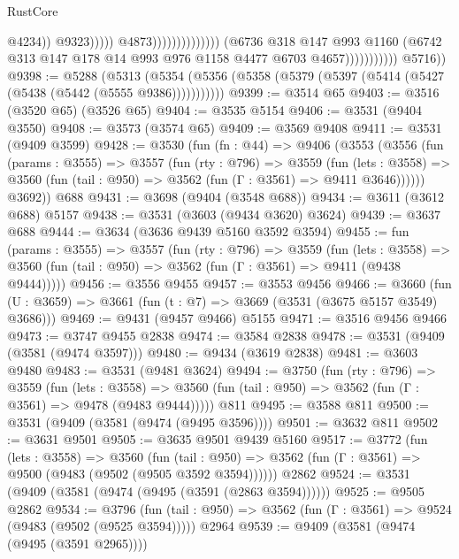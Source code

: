 \begin{lexlean}{RustCore}
\begin{coremodule}
                                                                    @4234))
                                                                @9323)))))
                                                      @4873))))))))))))))
                          (@6736
                            @318
                            @147
                            @993
                            @1160
                            (@6742 @313 @147 @178 @14 @993 @976 @1158 @4477 @6703 @4657)))))))))))
        @5716))
@9398 := @5288
    (@5313 (@5354 (@5356 (@5358 (@5379 (@5397 (@5414 (@5427 (@5438 (@5442 (@5555 @9386)))))))))))
@9399 := @3514 @65
@9403 := @3516 (@3520 @65) (@3526 @65)
@9404 := @3535 @5154
@9406 := @3531 (@9404 @3550)
@9408 := @3573 (@3574 @65)
@9409 := @3569 @9408
@9411 := @3531 (@9409 @3599)
@9428 := @3530
    (fun (fn : @44) =>
    @9406
      (@3553
        (@3556
          (fun (params : @3555) =>
          @3557
            (fun (rty : @796) =>
            @3559
              (fun (lets : @3558) =>
              @3560 (fun (tail : @950) => @3562 (fun (Γ : @3561) => @9411 @3646))))))
        @3692))
    @688
@9431 := @3698 (@9404 (@3548 @688))
@9434 := @3611 (@3612 @688) @5157
@9438 := @3531 (@3603 (@9434 @3620) @3624)
@9439 := @3637 @688
@9444 := @3634 (@3636 @9439 @5160 @3592 @3594)
@9455 := fun (params : @3555) =>
  @3557
    (fun (rty : @796) =>
    @3559
      (fun (lets : @3558) =>
      @3560 (fun (tail : @950) => @3562 (fun (Γ : @3561) => @9411 (@9438 @9444)))))
@9456 := @3556 @9455
@9457 := @3553 @9456
@9466 := @3660 (fun (U : @3659) => @3661 (fun (t : @7) => @3669 (@3531 (@3675 @5157 @3549) @3686)))
@9469 := @9431 (@9457 @9466) @5155
@9471 := @3516 @9456 @9466
@9473 := @3747 @9455 @2838
@9474 := @3584 @2838
@9478 := @3531 (@9409 (@3581 (@9474 @3597)))
@9480 := @9434 (@3619 @2838)
@9481 := @3603 @9480
@9483 := @3531 (@9481 @3624)
@9494 := @3750
    (fun (rty : @796) =>
    @3559
      (fun (lets : @3558) =>
      @3560 (fun (tail : @950) => @3562 (fun (Γ : @3561) => @9478 (@9483 @9444)))))
    @811
@9495 := @3588 @811
@9500 := @3531 (@9409 (@3581 (@9474 (@9495 @3596))))
@9501 := @3632 @811
@9502 := @3631 @9501
@9505 := @3635 @9501 @9439 @5160
@9517 := @3772
    (fun (lets : @3558) =>
    @3560
      (fun (tail : @950) => @3562 (fun (Γ : @3561) => @9500 (@9483 (@9502 (@9505 @3592 @3594))))))
    @2862
@9524 := @3531 (@9409 (@3581 (@9474 (@9495 (@3591 (@2863 @3594))))))
@9525 := @9505 @2862
@9534 := @3796
    (fun (tail : @950) => @3562 (fun (Γ : @3561) => @9524 (@9483 (@9502 (@9525 @3594)))))
    @2964
@9539 := @9409 (@3581 (@9474 (@9495 (@3591 @2965))))

\end{coremodule}
\end{lexlean}
